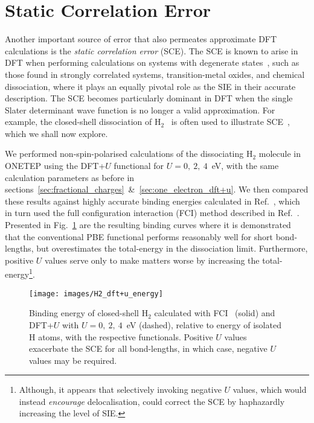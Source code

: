 {%
\section{Static Correlation Error}
\label{sec:static_correlation_error}

Another {important} source of error  
that also permeates approximate DFT calculations 
is the {\it static correlation error} (SCE).
%
The SCE is known to arise in DFT 
when performing calculations on systems with 
degenerate states~\cite{seminario1996recent,PhysRevLett.87.133004,doi:10.1063/1.1589733,cohen2008insights,doi:10.1021/cr200107z}, 
such as those found in 
strongly correlated systems, 
transition-metal oxides,
and chemical dissociation, 
where it plays an equally pivotal role as the SIE 
in their accurate description.
%
The SCE becomes particularly dominant in DFT 
when the single Slater determinant wave function  
is no longer a valid approximation.
%
For example, 
the closed-shell dissociation of 
H$_2$~\cite{doi:10.1063/1.1589733,doi:10.1063/1.1858371,
PhysRevLett.87.133004,
doi:10.1063/1.2747248,
cohen2008insights} 
is often used to illustrate SCE~\cite{cohen2008insights,doi:10.1021/cr200107z,doi:10.1063/1.2987202}, 
which we shall now explore.

We performed  non-spin-polarised 
calculations of the dissociating H$_2$ molecule 
in {\sc ONETEP} 
using the DFT+$U$ functional 
for $U=0,\ 2,\ 4$~eV, 
with the same calculation parameters 
as before in sections~\ref{sec:fractional_charges}~\&~\ref{sec:one_electron_dft+u}.
%
We then compared these results against 
highly accurate binding energies 
calculated in Ref.~\cite{sims2006high}, 
which in turn used the full configuration interaction (FCI) 
method described in Ref.~\cite{PhysRevA.4.908}.
%
Presented in Fig.~\ref{fig:H2_dft+u_energy} 
are the resulting binding curves 
where it is demonstrated that the 
conventional PBE functional 
performs reasonably well 
for short bond-lengths, 
but overestimates the total-energy 
in the dissociation limit.
%
Furthermore, 
positive $U$ values 
serve only to make matters worse 
by increasing the total-energy\footnote{
Although, it appears that 
selectively invoking negative $U$ values,  
which would instead {\it encourage} delocalisation, 
could correct the SCE 
by haphazardly increasing the level of SIE.}.
%
\begin{figure}[th!]
\centering
\texttt{[image: images/H2\_dft+u\_energy]}
\caption[Binding energy curve of H$_2$ with DFT+$U$]
{Binding energy of {closed-shell} H$_2$ 
calculated with FCI~\cite{sims2006high} (solid) and 
DFT+$U$ with $U=0,\ 2,\ 4$~eV (dashed), 
relative to energy of isolated H atoms, 
{with the respective functionals}.
%
Positive $U$ values exacerbate the SCE 
for all bond-lengths, in which case, 
negative $U$ values may be required.}
\label{fig:H2_dft+u_energy}
\end{figure}
%



}
